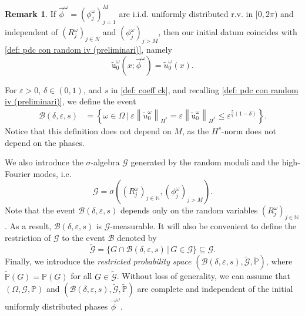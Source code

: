 \documentclass[a4paper,10pt,reqno]{article}
\theoremstyle{definition}
\theoremstyle{plain}
\theoremstyle{plain}
\theoremstyle{definition}
\theoremstyle{plain}
\theoremstyle{plain}
\theoremstyle{plain}
\theoremstyle{definition}
\newtheorem{rem}[definition]{Remark}
\theoremstyle{definition}
\newcommand{\norm}[1]{\left\lVert #1 \right\rVert}
\def \N{\mathbb N}
\def \P{{\mathbb P}}
\def \tu{\mathtt{u}}
\begin{document}
\begin{rem}
If $\vec{\phi}^{\omega} = (\phi_j^{\omega})_{j=1}^M$ are i.i.d. uniformly distributed r.v. in $[0,2\pi)$ and independent of $(R_j^{\omega})_{j \in N}$ and $(\phi_j^{\omega})_{j > M}$, then our initial datum coincides with \eqref{def: pdc con random iv (preliminari)}, namely
    \[
    \widetilde{\tu}_0^{\omega}(x ; \vec{\phi}^{\omega} ) = \widetilde{u}_0^{\omega}(x).
    \]
\end{rem}

For $\varepsilon > 0$, $\delta \in (0,1)$, and $s$ in \eqref{def: coeff ck}, and recalling \eqref{def: pdc con random iv (preliminari)}, we define the event
\begin{equation} \label{def: event small size initial datum}
\begin{split}
\mathcal{B}(\delta,\varepsilon,s) & = \left \{ \omega \in \mathbb{\Omega} \ \Big | \ \varepsilon \norm{\widetilde{u}^{\omega}_0}_{\dot{H}^s} = \varepsilon \norm{\widetilde{\tu}^{\omega}_0}_{\dot{H}^s} \le \varepsilon^{\frac57 (1-\delta)} \right \}.
\end{split}
\end{equation}
Notice that this definition does not depend on $M$, as the $H^s$-norm does not depend on the phases.

We also introduce the $\sigma$-algebra $\mathcal{G}$ generated by the random moduli and the high-Fourier modes, i.e. 
    \begin{equation} \label{def: sigma algebra senza fasi basse}
    \mathcal{G} = \sigma ( (R_j^{\omega})_{j \in \N} , (\phi_j^{\omega})_{j > M} ). %
    \end{equation}
Note that the event $\mathcal{B}(\delta,\varepsilon,s)$  depends only on the random variables $(R_j^{\omega})_{j \in \N}$. As a result, $\mathcal{B}(\delta,\varepsilon,s)$ is $\mathcal{G}$-measurable. It will also be convenient to define  the restriction of $\mathcal{G}$ to the event $\mathcal{B}$ denoted by 
\begin{equation}\label{def:tildeG}
    \widetilde{\mathcal{G}} = \{ G \cap \mathcal{B}(\delta,\varepsilon,s) \, \lvert \, G \in \mathcal{G} \}\subseteq \mathcal{G}.
\end{equation}
Finally, we introduce the \textit{restricted probability space} $(\mathcal{B}(\delta,\varepsilon,s) , \widetilde{\mathcal{G}} , \widetilde{\P} )$, where $\widetilde{\P}(G) = \P(G)$ for all $G \in \widetilde{\mathcal{G}}$. Without loss of generality, we can assume that $(\mathbb{\Omega},\mathcal{G},\mathbb{P})$ and $(\mathcal{B}(\delta,\varepsilon,s), \widetilde{\mathcal{G}},\widetilde{\P})$ are complete and independent of the initial uniformly distributed phases $\vec{\phi}^{\omega}$.
\end{document}
